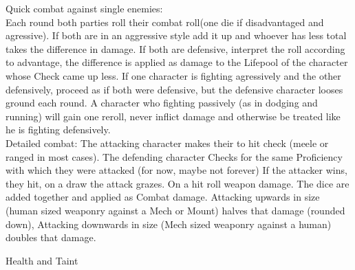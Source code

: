 \documentclass{article}
\newcommand{\subhline}[1]{\begin{center}\large #1 \normalsize \end{center}}
\begin{document}
Quick combat against single enemies:\\
Each round both parties roll their combat roll(one die if disadvantaged and agressive). If both are in an aggressive
style add it up and whoever has less total takes the difference in damage. If both are defensive, interpret the roll
according to advantage, the difference is applied as damage to the Lifepool of the character whose Check came up less.
If one character is fighting agressively and the other defensively, proceed as if both were defensive, but the defensive
character looses ground each round. A character who fighting passively (as in dodging and running) will gain one
reroll, never inflict damage and otherwise be treated like he is fighting defensively. \\

Detailed combat:
The attacking character makes their to hit check (meele or ranged in most cases). The defending character Checks for the
same Proficiency with which they were attacked (for now, maybe not forever) If the attacker wins, they hit, on a draw the
attack grazes. On a hit roll weapon damage. The dice are added together and applied as Combat damage. Attacking upwards
in size (human sized weaponry against a Mech or Mount) halves that damage (rounded down), Attacking downwards in size
(Mech sized weaponry against a human) doubles that damage.


\subhline{Health and Taint}
\end{document}
